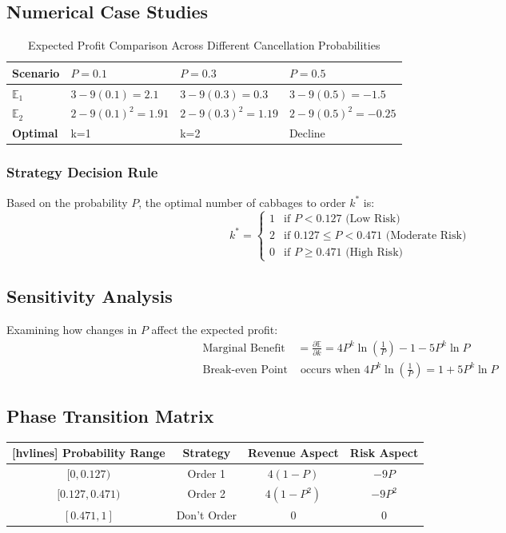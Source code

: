 \documentclass[11pt]{article}
\begin{document}
\subsection*{Numerical Case Studies}
\begin{table}[H]
\centering
\begin{tabularx}{0.95\textwidth}{lYYY}
\toprule
\textbf{Scenario} & \( P=0.1 \) & \( P=0.3 \) & \( P=0.5 \) \\
\midrule
\( \mathbb{E}_1 \) & \( 3 - 9(0.1) = 2.1 \) & \( 3 - 9(0.3) = 0.3 \) & \( 3 - 9(0.5) = -1.5 \) \\
\( \mathbb{E}_2 \) & \( 2 - 9(0.1)^2 = 1.91 \) & \( 2 - 9(0.3)^2 = 1.19 \) & \( 2 - 9(0.5)^2 = -0.25 \) \\
\textbf{Optimal} & k=1 & k=2 & Decline \\
\bottomrule
\end{tabularx}
\caption{Expected Profit Comparison Across Different Cancellation Probabilities}
\end{table}

\begin{strategybox}
\subsubsection*{Strategy Decision Rule}
Based on the probability \( P \), the optimal number of cabbages to order \( k^* \) is:
\[
k^* = \begin{cases}
1 & \text{if } P < 0.127 \text{ (Low Risk)} \\
2 & \text{if } 0.127 \leq P < 0.471 \text{ (Moderate Risk)} \\
0 & \text{if } P \geq 0.471 \text{ (High Risk)}
\end{cases}
\]
\end{strategybox}

\subsection*{Sensitivity Analysis}
Examining how changes in \( P \) affect the expected profit:
\begin{align*}
\text{Marginal Benefit} &= \frac{\partial \mathbb{E}}{\partial k} = 4P^k\ln \left(\frac{1}{P}\right) - 1 - 5P^k\ln P \\
\text{Break-even Point} & \text{ occurs when } 4P^k\ln \left(\frac{1}{P}\right) = 1 + 5P^k\ln P
\end{align*}

\subsection*{Phase Transition Matrix}
\begin{NiceTabular}{|c|c|c|c|}[hvlines]
\hline
\RowStyle{\bfseries}Probability Range & Strategy & Revenue Aspect & Risk Aspect \\
\hline
$[0, 0.127)$ & Order 1 & $4(1-P)$ & $-9P$ \\
$[0.127, 0.471)$ & Order 2 & $4(1-P^2)$ & $-9P^2$ \\
$[0.471, 1]$ & Don't Order & 0 & 0 \\
\hline
\end{NiceTabular}
\end{document}
